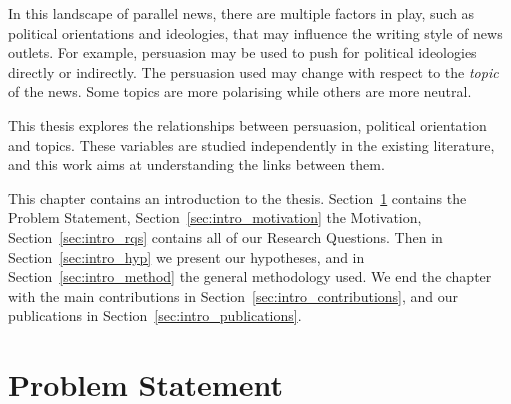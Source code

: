 In this landscape of parallel news, there are multiple factors in play, such as political orientations and ideologies, that may influence the writing style of news outlets.
For example, persuasion may be used to push for political ideologies directly or indirectly.
The persuasion used may change with respect to the \emph{topic} of the news. Some topics are more polarising while others are more neutral.




This thesis explores the relationships between persuasion, political orientation and topics.
These variables are studied independently in the existing literature, and this work aims at understanding the links between them.









This chapter contains an introduction to the thesis.
Section~\ref{sec:intro_problem} contains the Problem Statement, Section~\ref{sec:intro_motivation} the Motivation, Section~\ref{sec:intro_rqs} contains all of our Research Questions. Then in Section~\ref{sec:intro_hyp} we present our hypotheses, and in Section~\ref{sec:intro_method} the general methodology used. We end the chapter with the main contributions in Section~\ref{sec:intro_contributions}, %
and our publications in Section~\ref{sec:intro_publications}.


\section{\statusgreen Problem Statement}
\label{sec:intro_problem}


